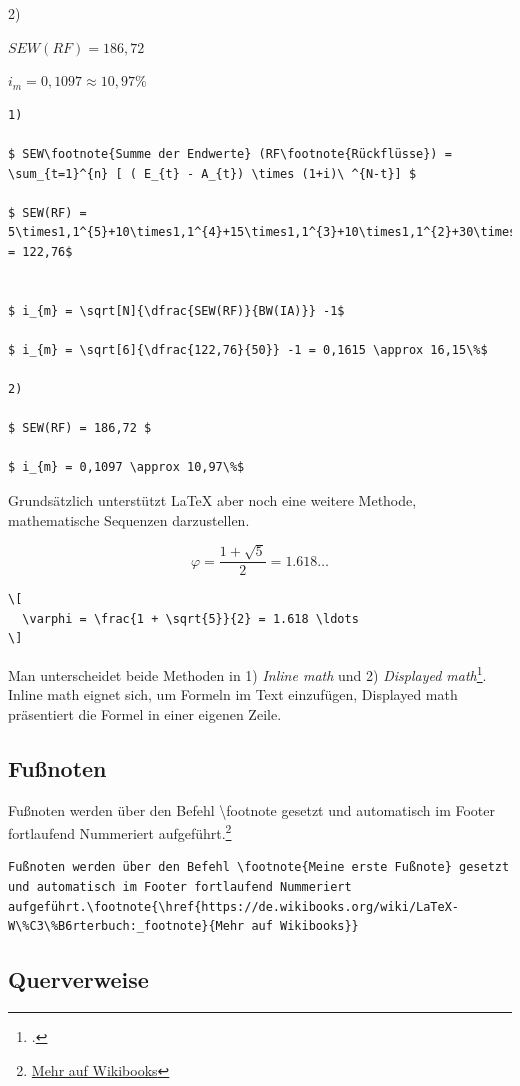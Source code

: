 2)

$ SEW(RF) = 186,72 $

$ i_{m} = 0,1097 \approx 10,97\%$
\begin{lstlisting}
1)

$ SEW\footnote{Summe der Endwerte} (RF\footnote{Rückflüsse}) = \sum_{t=1}^{n} [ ( E_{t} - A_{t}) \times (1+i)\ ^{N-t}] $

$ SEW(RF) = 5\times1,1^{5}+10\times1,1^{4}+15\times1,1^{3}+10\times1,1^{2}+30\times1,1^{1}+35 = 122,76$


$ i_{m} = \sqrt[N]{\dfrac{SEW(RF)}{BW(IA)}} -1$

$ i_{m} = \sqrt[6]{\dfrac{122,76}{50}} -1 = 0,1615 \approx 16,15\%$

2)

$ SEW(RF) = 186,72 $

$ i_{m} = 0,1097 \approx 10,97\%$
\end{lstlisting}

Grundsätzlich unterstützt \LaTeX{} aber noch eine weitere Methode, mathematische Sequenzen darzustellen.

\[
  \varphi = \frac{1 + \sqrt{5}}{2} = 1.618 \ldots
\]

\begin{lstlisting}
\[
  \varphi = \frac{1 + \sqrt{5}}{2} = 1.618 \ldots
\]
\end{lstlisting}
Man unterscheidet beide Methoden in 1) \emph{Inline math} und 2) \emph{Displayed math}\footcite[Vgl. ][S.276]{kottwitz_latex_2015}. Inline math eignet sich, um Formeln im Text einzufügen, Displayed math präsentiert die Formel in einer eigenen Zeile.

\subsection{Fußnoten}
Fußnoten werden über den Befehl \textbackslash footnote gesetzt und automatisch im Footer fortlaufend Nummeriert aufgeführt.\footnote{\href{https://de.wikibooks.org/wiki/LaTeX-W\%C3\%B6rterbuch:_footnote}{Mehr auf Wikibooks}}
\begin{lstlisting}
Fußnoten werden über den Befehl \footnote{Meine erste Fußnote} gesetzt und automatisch im Footer fortlaufend Nummeriert aufgeführt.\footnote{\href{https://de.wikibooks.org/wiki/LaTeX-W\%C3\%B6rterbuch:_footnote}{Mehr auf Wikibooks}}
\end{lstlisting}

\subsection{Querverweise}

